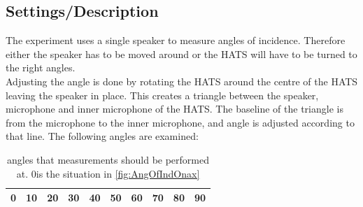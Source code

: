 \subsection{Settings/Description}
The experiment uses a single speaker to measure angles of incidence. Therefore either the speaker has to be moved around or the HATS will have to be turned to the right angles. \\
Adjusting the angle is done by rotating the HATS around the centre of the HATS leaving the speaker in place. This creates a triangle between the speaker, microphone and inner microphone of the HATS. The baseline of the triangle is from the microphone to the inner microphone, and angle is adjusted according to that line.
The following angles are examined:
\begin{table}[H]
	\centering
	\begin{tabular}{c c c c c c c c c c} \toprule
		0 & 10 & 20 & 30 & 40 & 50 & 60 & 70 & 80 & 90 \\ \bottomrule
	\end{tabular}
\label{Tab:AngleOfInciMeasAngles}
\caption{angles that measurements should be performed at. 0\textdegree is the situation in \autoref{fig:AngOfIndOnax}}
\end{table}
 

